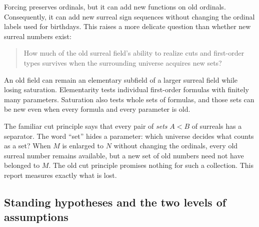 \documentclass[11pt,letterpaper]{article}
\numberwithin{equation}{section}
\theoremstyle{definition}
\theoremstyle{remark}
\begin{document}
Forcing preserves ordinals, but it can add new functions on old ordinals.
Consequently, it can add new surreal sign sequences without changing the
ordinal labels used for birthdays. This raises a more delicate question than
whether new surreal numbers exist:
\begin{quote}
How much of the old surreal field's ability to realize cuts and first-order
types survives when the surrounding universe acquires new sets?
\end{quote}
An old field can remain an elementary subfield of a larger surreal field while
losing saturation. Elementarity tests individual first-order formulas with
finitely many parameters. Saturation also tests whole sets of formulas, and
those sets can be new even when every formula and every parameter is old.

The familiar cut principle says that every pair of \emph{sets} $A<B$ of
surreals has a separator. The word ``set'' hides a parameter: which universe
decides what counts as a set? When $M$ is enlarged to $N$ without changing the
ordinals, every old surreal number remains available, but a new set of old
numbers need not have belonged to $M$. The old cut principle promises nothing
for such a collection. This report measures exactly what is lost.

\subsection{Standing hypotheses and the two levels of assumptions}\label{univ:sub:levels}
\end{document}
